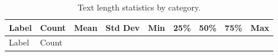 \documentclass[
  titlepage]{article}
\begin{document}
\begin{longtable}[]{@{}
  >{\raggedright\arraybackslash}p{}
  >{\raggedright\arraybackslash}p{}
  >{\raggedright\arraybackslash}p{}
  >{\raggedright\arraybackslash}p{}
  >{\raggedright\arraybackslash}p{}
  >{\raggedright\arraybackslash}p{}
  >{\raggedright\arraybackslash}p{}
  >{\raggedright\arraybackslash}p{}
  >{\raggedright\arraybackslash}p{}@{}}
\caption{Text length statistics by category.}\tabularnewline
\toprule\noalign{}
\begin{minipage}[b]{\linewidth}\raggedright
Label
\end{minipage} & \begin{minipage}[b]{\linewidth}\raggedright
Count
\end{minipage} & \begin{minipage}[b]{\linewidth}\raggedright
Mean
\end{minipage} & \begin{minipage}[b]{\linewidth}\raggedright
Std Dev
\end{minipage} & \begin{minipage}[b]{\linewidth}\raggedright
Min
\end{minipage} & \begin{minipage}[b]{\linewidth}\raggedright
25\%
\end{minipage} & \begin{minipage}[b]{\linewidth}\raggedright
50\%
\end{minipage} & \begin{minipage}[b]{\linewidth}\raggedright
75\%
\end{minipage} & \begin{minipage}[b]{\linewidth}\raggedright
Max
\end{minipage} \\
\midrule\noalign{}
\endfirsthead
\toprule\noalign{}
\begin{minipage}[b]{\linewidth}\raggedright
Label
\end{minipage} & \begin{minipage}[b]{\linewidth}\raggedright
Count
\end{minipage} & \begin{minipage}[b]{\linewidth}\raggedright

\end{minipage}
\end{longtable}
\end{document}
